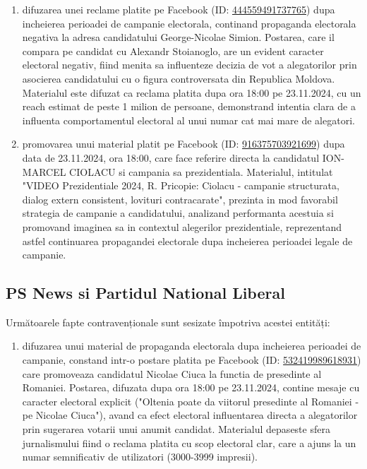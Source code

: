 \documentclass[a4paper,12pt]{article}
\begin{document}
\begin{enumerate}[leftmargin=*, label=\arabic*.)]
    \item difuzarea unei reclame platite pe Facebook (ID: \href{https://www.facebook.com/ads/library/?id=444559491737765}{444559491737765}) dupa incheierea perioadei de campanie electorala, continand propaganda electorala negativa la adresa candidatului George-Nicolae Simion. Postarea, care il compara pe candidat cu Alexandr Stoianoglo, are un evident caracter electoral negativ, fiind menita sa influenteze decizia de vot a alegatorilor prin asocierea candidatului cu o figura controversata din Republica Moldova. Materialul este difuzat ca reclama platita dupa ora 18:00 pe 23.11.2024, cu un reach estimat de peste 1 milion de persoane, demonstrand intentia clara de a influenta comportamentul electoral al unui numar cat mai mare de alegatori.
    \item promovarea unui material platit pe Facebook (ID: \href{https://www.facebook.com/ads/library/?id=916375703921699}{916375703921699}) dupa data de 23.11.2024, ora 18:00, care face referire directa la candidatul ION-MARCEL CIOLACU si campania sa prezidentiala. Materialul, intitulat "VIDEO Prezidentiale 2024, R. Pricopie: Ciolacu - campanie structurata, dialog extern consistent, lovituri contracarate", prezinta in mod favorabil strategia de campanie a candidatului, analizand performanta acestuia si promovand imaginea sa in contextul alegerilor prezidentiale, reprezentand astfel continuarea propagandei electorale dupa incheierea perioadei legale de campanie.
\end{enumerate}

\vspace{0.5cm}

\subsection{PS News si Partidul National Liberal}
Următoarele fapte contravenționale sunt sesizate împotriva acestei entități:

\begin{enumerate}[leftmargin=*, label=\arabic*.)]
    \item difuzarea unui material de propaganda electorala dupa incheierea perioadei de campanie, constand intr-o postare platita pe Facebook (ID: \href{https://www.facebook.com/ads/library/?id=532419989618931}{532419989618931}) care promoveaza candidatul Nicolae Ciuca la functia de presedinte al Romaniei. Postarea, difuzata dupa ora 18:00 pe 23.11.2024, contine mesaje cu caracter electoral explicit ("Oltenia poate da viitorul presedinte al Romaniei - pe Nicolae Ciuca"), avand ca efect electoral influentarea directa a alegatorilor prin sugerarea votarii unui anumit candidat. Materialul depaseste sfera jurnalismului fiind o reclama platita cu scop electoral clar, care a ajuns la un numar semnificativ de utilizatori (3000-3999 impresii).
\end{enumerate}
\end{document}
